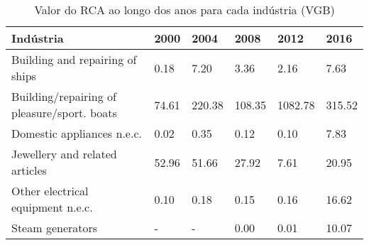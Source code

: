 \begin{table}
\centering
\caption{Valor do RCA ao longo dos anos para cada indústria (VGB)}
\label{tab:ex3-tempo-VGB}
\begin{tabular}{p{6cm}p{1.5cm}p{1.5cm}p{1.5cm}p{1.5cm}p{1.5cm}}
\toprule
                                  Indústria &  2000 &   2004 &   2008 &    2012 &   2016 \\
\midrule
            Building and repairing of ships &  0.18 &   7.20 &   3.36 &    2.16 &   7.63 \\
Building/repairing of pleasure/sport. boats & 74.61 & 220.38 & 108.35 & 1082.78 & 315.52 \\
                 Domestic appliances n.e.c. &  0.02 &   0.35 &   0.12 &    0.10 &   7.83 \\
             Jewellery and related articles & 52.96 &  51.66 &  27.92 &    7.61 &  20.95 \\
          Other electrical equipment n.e.c. &  0.10 &   0.18 &   0.15 &    0.16 &  16.62 \\
                           Steam generators &     - &      - &   0.00 &    0.01 &  10.07 \\
\bottomrule
\end{tabular}
\end{table}
